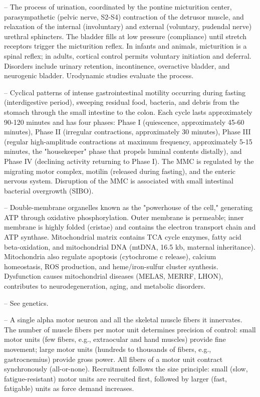-- The process of urination, coordinated by the pontine micturition center, parasympathetic (pelvic nerve, S2-S4) contraction of the detrusor muscle, and relaxation of the internal (involuntary) and external (voluntary, pudendal nerve) urethral sphincters. The bladder fills at low pressure (compliance) until stretch receptors trigger the micturition reflex. In infants and animals, micturition is a spinal reflex; in adults, cortical control permits voluntary initiation and deferral. Disorders include urinary retention, incontinence, overactive bladder, and neurogenic bladder. Urodynamic studies evaluate the process.

-- Cyclical patterns of intense gastrointestinal motility occurring during fasting (interdigestive period), sweeping residual food, bacteria, and debris from the stomach through the small intestine to the colon. Each cycle lasts approximately 90-120 minutes and has four phases: Phase I (quiescence, approximately 45-60 minutes), Phase II (irregular contractions, approximately 30 minutes), Phase III (regular high-amplitude contractions at maximum frequency, approximately 5-15 minutes, the "housekeeper" phase that propels luminal contents distally), and Phase IV (declining activity returning to Phase I). The MMC is regulated by the migrating motor complex, motilin (released during fasting), and the enteric nervous system. Disruption of the MMC is associated with small intestinal bacterial overgrowth (SIBO).

-- Double-membrane organelles known as the "powerhouse of the cell," generating ATP through oxidative phosphorylation. Outer membrane is permeable; inner membrane is highly folded (cristae) and contains the electron transport chain and ATP synthase. Mitochondrial matrix contains TCA cycle enzymes, fatty acid beta-oxidation, and mitochondrial DNA (mtDNA, 16.5 kb, maternal inheritance). Mitochondria also regulate apoptosis (cytochrome c release), calcium homeostasis, ROS production, and heme/iron-sulfur cluster synthesis. Dysfunction causes mitochondrial diseases (MELAS, MERRF, LHON), contributes to neurodegeneration, aging, and metabolic disorders.

-- See genetics.

-- A single alpha motor neuron and all the skeletal muscle fibers it innervates. The number of muscle fibers per motor unit determines precision of control: small motor units (few fibers, e.g., extraocular and hand muscles) provide fine movement; large motor units (hundreds to thousands of fibers, e.g., gastrocnemius) provide gross power. All fibers of a motor unit contract synchronously (all-or-none). Recruitment follows the size principle: small (slow, fatigue-resistant) motor units are recruited first, followed by larger (fast, fatigable) units as force demand increases.

